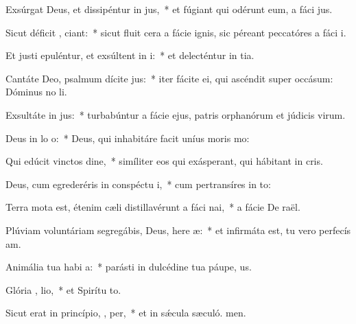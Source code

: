 \item Exsúrgat Deus, et dissipéntur in jus,~* et fúgiant qui odérunt eum, a fáci jus.
\item Sicut déficit , ciant:~* sicut fluit cera a fácie ignis, sic péreant peccatóres a fáci i.
\item Et justi epuléntur, et exsúltent in  i:~* et delecténtur in tia.
\item Cantáte Deo, psalmum dícite  jus:~* iter fácite ei, qui ascéndit super occásum: Dóminus no li.
\item Exsultáte in  jus:~* turbabúntur a fácie ejus, patris orphanórum et júdicis virum.
\item Deus in lo  o:~* Deus, qui inhabitáre facit uníus moris  mo:
\item Qui edúcit vinctos  dine,~* simíliter eos qui exásperant, qui hábitant in cris.
\item Deus, cum egrederéris in conspéctu  i,~* cum pertransíres in to:
\item Terra mota est, étenim cæli distillavérunt a fáci  nai,~* a fácie De raël.
\item Plúviam voluntáriam segregábis, Deus, here æ:~* et infirmáta est, tu vero perfecís am.
\item Animália tua habi  a:~* parásti in dulcédine tua páupe, us.
\item Glória ,  lio,~* et Spirítu to.
\item Sicut erat in princípio,  ,  per,~* et in sǽcula sæculó. men.
